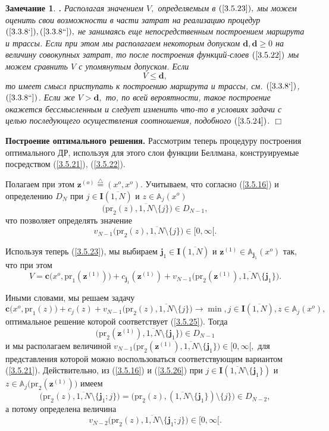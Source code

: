 \documentclass[11pt,twoside,openany]{report}
\newcommand{\bfn}{\begin{equation}}
\newcommand{\efn}{\end{equation}}
\newcommand{\df}{\stackrel{\triangle}{=}}
\newcommand{\ov}{\overline}
\newcounter{theo}
\newcounter{zam}
\newtheorem{zam}{Замечание}[section]
\newcommand{\TL}{\mbox{\bf{$\!\!$.}}}
\newcommand{\sm}{\setminus}
\newcommand{\bba}{{\mathbb A}}
\begin{document}
{\begin{zam}
\label{z3.5.1}{\TL}
Располагая значением $V,$ определяемым в $(\ref{3.5.23}),$
мы можем оценить свои возможности в части затрат на реализацию процедур $(\ref{3.3.8`}),
(\ref{3.3.8``}),$
не занимаясь еще непосредственным построением маршрута и трассы.
Если при
этом мы располагаем некоторым допуском $\mathbf{d}, \mathbf{d}\geqslant 0$
на величину
совокупных затрат, то после построения функций-слоев
$(\ref{3.5.22})$ мы можем сравнить $V$
с упомянутым допуском.
Если
\bfn
  \label{3.5.24}
  V \leqslant \mathbf{d}
  ,
\efn
то имеет смысл приступать к построению маршрута и трассы,
см. $(\ref{3.3.8`})$, $(\ref{3.3.8``})$.
Если же $V > \mathbf{d},$
то, по всей вероятности, такое построение
окажется бессмысленным и следует изменить что-то в условиях задачи с целью последующего
осуществления соотношения,
подобного $(\ref{3.5.24})$.
\hfill $\Box$
\end{zam}

{\bf Построение оптимального решения.}
Рассмотрим теперь процедуру построения оптимального ДР,
используя для этого слои функции Беллмана,
конструируемые посредством (\ref{3.5.21}), (\ref{3.5.22}).

Полагаем при этом
$\mathbf{z}^{(o)} \df (x^o,x^o).$
Учитываем, что согласно (\ref{3.5.16})
и определению $D_N$ при
$j\in \mathbf{I}(\ov{1,N})$ и $z\in \bba_j(x^o)$
$$
  \bigl(\mathrm{pr}_2(z),\ov{1,N}\sm \{j\}\bigl) \in D_{N-1}
  ,
$$
что позволяет определять значение
$$
  v_{N-1}\bigl(\mathrm{pr}_2(z),\ov{1,N}\sm \{j\}\bigl)\in [0,\infty[
    .
$$

Используя теперь (\ref{3.5.23}),
мы выбираем
$\mathbf{j}_1\in \mathbf{I}(\ov{1,N})$ и $\mathbf{z}^{(1)}\in \bba_{\mathbf{j}_1}(x^o)$
так, что при этом
\bfn
  \label{3.5.25}
  V = \mathbf{c}\bigl(x^o,\mathrm{pr}_1(\mathbf{z}^{(1)})\bigl) +
  c_{\mathbf{j}_1}(\mathbf{z}^{(1)}) + v_{N-1}\bigl(\mathrm{pr}_2(\mathbf{z}^{(1)}),
  \ov{1,N}\sm \{\mathbf{j}_1\}\bigl)
  .
\efn

Иными словами, мы решаем задачу
$$
  \mathbf{c}\bigl(x^o,\mathrm{pr}_1(z)\bigl) + c_j(z) + v_{N-1}\bigl(\mathrm{pr}_2(z),
  \ov{1,N}\sm\{j\}\bigl) \longrightarrow \min, j\in \mathbf{I}(\ov{1,N}), z\in \bba_j(x^o)
  ,
$$
оптимальное решение которой соответствует (\ref{3.5.25}).
Тогда
\bfn
  \label{3.5.26}
  \bigl(\mathrm{pr}_2(\mathbf{z}^{(1)}),\ov{1,N}\sm \{\mathbf{j}_1\}\bigl) \in D_{N-1}
\efn
и мы располагаем величиной
$v_{N-1}\bigl(\mathrm{pr}_2(\mathbf{z}^{(1)}),\ov{1,N}\sm
\{\mathbf{j}_1\}\bigl) \in [0,\infty[,$
для представления которой можно воспользоваться
соответствующим вариантом (\ref{3.5.21}).
Действительно, из (\ref{3.5.16}) и (\ref{3.5.26})
при $j\in \mathbf{I}(\ov{1,N}\sm \{\mathbf{j}_1\})$
и $z\in \bba_j\bigl(\mathrm{pr}_2 (\mathbf{z}^{(1)})\bigl)$
имеем
\bfn
  \label{3.5.26`}
  \bigl(\mathrm{pr}_2(z),\ov{1,N}\sm
  \{\mathbf{j}_1;j\}\bigl) = \bigl(\mathrm{pr}_2(z),(\ov{1,N}\sm\{\mathbf{j}_1\})\sm\{j\}
  \bigl)\in D_{N-2}
  ,
\efn
а потому определена величина
$$
  v_{N-2}\bigl(\mathrm{pr}_2(z),\ov{1,N}\sm\{\mathbf{j}_1;j\}\bigl)\in [0,\infty[
  .
$$

}
\end{document}
